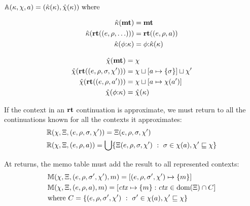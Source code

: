 \newcommand{\replacectx}{\hat\mkont} %
\newcommand{\addstore}{\hat\mmktab} %
\begin{center}
  $\approximate(\mkont, \mmktab, \maddr) = (\replacectx(\mkont), \addstore(\mkont)) \text{ where}$\\
  \begin{minipage}{0.45\linewidth}
    \begin{align*}
      \replacectx(\kmt) &= \kmt \\
      \replacectx(\krt{(\mexpr,\menv,\ldots)}) &= \krt{(\mexpr,\menv,\maddr)} \\
      \replacectx(\kcons{\mkframe}{\mkont}) &=
      \kcons{\mkframe}{\replacectx(\mkont)}
    \end{align*}
  \end{minipage}
  \begin{minipage}{0.50\linewidth}
    \begin{align*}
      \addstore(\kmt) &= \mmktab \\
      \addstore(\krt{(\mexpr,\menv,\mstore,\mmktab')}) &= \joinone{\mmktab}{\maddr}{\mstore}\sqcup \mmktab' \\
      \addstore(\krt{(\mexpr,\menv,\maddr')}) &= \joinm{\mmktab}{\maddr}{\mmktab(\maddr')} \\
      \addstore(\kcons{\mkframe}{\mkont}) &= \addstore(\mkont)
    \end{align*}
  \end{minipage}
\end{center}
%
If the context in an $\mathbf{rt}$ continuation is approximate, we must return to all the continuations known for all the contexts it approximates:
\begin{align*}
  &{\mathbb R}(\chi, \Xi, (e,\rho, \sigma, \chi')) = \Xi(e,\rho, \sigma, \chi') \\
  &{\mathbb R}(\chi, \Xi, (e,\rho, a)) =
    \bigcup\{ \Xi(e,\rho,\sigma,\chi')\ :\ \sigma \in \chi(a), \chi' \sqsubseteq \chi\}
\end{align*}

At returns, the memo table must add the result to all represented contexts:
\newcommand{\res}{m}
\begin{align*}
  &\memoize(\mmktab, \mktab, (\mexpr,\menv, \mstore', \mmktab'), \res) =
  [(\mexpr,\menv, \mstore',\mmktab') \mapsto \set{{\res}}] \\
  &\memoize(\mmktab, \mktab, (\mexpr,\menv, \maddr), \res) = [\mctx \mapsto \set{\res} : \mctx \in \dom(\mktab) \cap C] \\
  &\text{where } C = \setbuild{(\mexpr,\menv, \mstore', \mmktab')}{\mstore' \in \mmktab(\maddr), \mmktab' \sqsubseteq \mmktab}
\end{align*}

